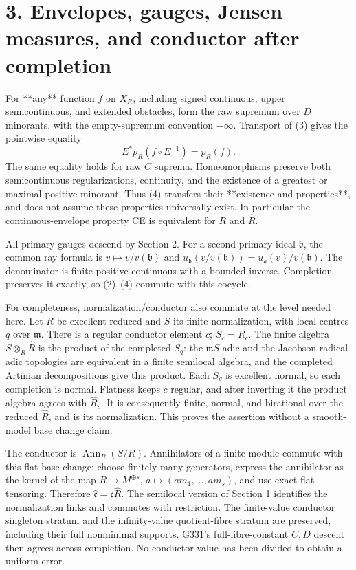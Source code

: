 \documentclass[11pt]{article}
\begin{document}
\section{3. Envelopes, gauges, Jensen measures, and conductor after completion}

For **any** function $f$ on $X_R$, including signed continuous, upper semicontinuous, and extended obstacles, form the raw supremum over $D$ minorants, with the empty-supremum convention $-\infty$. Transport of (3) gives the pointwise equality
\[
 E^*p_{\widehat R}(f\circ E^{-1})=p_R(f). \tag{4}
\]
The same equality holds for raw $C$ suprema. Homeomorphisms preserve both semicontinuous regularizations, continuity, and the existence of a greatest or maximal positive minorant. Thus (4) transfers their **existence and properties**, and does not assume these properties universally exist. In particular the continuous-envelope property CE is equivalent for $R$ and $\widehat R$.

All primary gauges descend by Section 2. For a second primary ideal $\mathfrak b$, the common ray formula is $v\mapsto v/v(\mathfrak b)$ and $u_{\mathfrak b}(v/v(\mathfrak b))=u_{\mathfrak a}(v)/v(\mathfrak b)$. The denominator is finite positive continuous with a bounded inverse. Completion preserves it exactly, so (2)--(4) commute with this cocycle.

For completeness, normalization/conductor also commute at the level needed here. Let $R$ be excellent reduced and $S$ its finite normalization, with local centres $q$ over $\mathfrak m$. There is a regular conductor element $c$; $S_c=R_c$. The finite algebra $S\otimes_R\widehat R$ is the product of the completed $S_q$: the $\mathfrak mS$-adic and the Jacobson-radical-adic topologies are equivalent in a finite semilocal algebra, and the completed Artinian decompositions give this product. Each $S_q$ is excellent normal, so each completion is normal. Flatness keeps $c$ regular, and after inverting it the product algebra agrees with $\widehat R_c$. It is consequently finite, normal, and birational over the reduced $\widehat R$, and is its normalization. This proves the assertion without a smooth-model base change claim.

The conductor is $\operatorname{Ann}_R(S/R)$. Annihilators of a finite module commute with this flat base change: choose finitely many generators, express the annihilator as the kernel of the map $R\to M^{\oplus s}$, $a\mapsto(am_1,\ldots,am_s)$, and use exact flat tensoring. Therefore $\widehat{\mathfrak c}=\mathfrak c\widehat R$. The semilocal version of Section 1 identifies the normalization links and commutes with restriction. The finite-value conductor singleton stratum and the infinity-value quotient-fibre stratum are preserved, including their full nonminimal supports. G331's full-fibre-constant $C,D$ descent then agrees across completion. No conductor value has been divided to obtain a uniform error.
\end{document}
